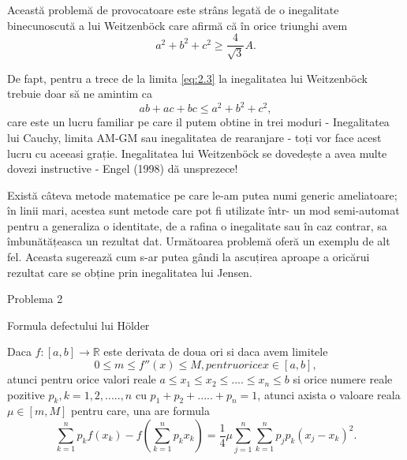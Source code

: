 \documentclass[a4paper,12pt,oneside]{report}
\begin{document}
Această problemă de provocatoare este strâns legată de o inegalitate binecunoscută a lui Weitzenböck care afirmă că în orice triunghi avem 
\begin{displaymath}
  a^{2} + b^{2} + c^{2} \geq \frac{4}{\sqrt{3}}A . \label{eq:2.4} \tag{2.4}
\end{displaymath}

De fapt, pentru a trece de la limita \ref{eq:2.3} la inegalitatea lui Weitzenböck trebuie doar să ne amintim ca 
\begin{displaymath}
  ab + ac + bc \leq a^{2} + b^{2} + c^{2}, 
\end{displaymath}
care este un lucru familiar pe care il putem obtine in trei moduri  - Inegalitatea lui Cauchy, limita AM-GM sau inegalitatea de rearanjare -  toți vor face acest lucru cu aceeasi grație.
	Inegalitatea lui Weitzenböck se dovedește a avea multe dovezi instructive - Engel (1998) dă unsprezece! 

Există câteva metode matematice pe care le-am putea numi generic ameliatoare; în linii mari, acestea sunt metode care pot fi utilizate într- un mod semi-automat pentru a generaliza o identitate, de a rafina o inegalitate sau în caz contrar, sa îmbunătățeasca un rezultat dat. 
Următoarea problemă oferă un exemplu de alt fel. Aceasta sugerează cum s-ar putea gândi la ascuțirea aproape a oricărui rezultat care se obține prin inegalitatea lui Jensen.

Problema 2

Formula defectului lui Hölder

Daca \(f : \left [ a,b  \right ] \to \mathbb{R}\) este derivata de doua ori si daca avem limitele 
\begin{displaymath}
  0 \leq m \leq  f''\left ( x \right ) \leq  M , pentru orice x\in \left [ a,b \right ], \label{eq:2.5} \tag{2.5}
\end{displaymath}
atunci pentru orice valori reale \(a\leq x_{1}\leq x_{2}\leq ....\leq x_{n} \leq b \) si orice numere reale pozitive \(p_{k}, k= 1,2,.....,n \) cu \(p_{1} + p_{2} + .....+ p_{n} = 1\), atunci axista o valoare reala \(\mu \in \left [ m, M \right ]\) pentru care, una are formula
\begin{displaymath}
  \sum_{k = 1}^{n}p_{k}f\left ( x_{k} \right ) - f\left ( \sum_{k = 1}^{n} p_{k}x_{k}\right ) = \frac{1}{4}\mu \sum_{j = 1}^{n}\sum_{k = 1}^{n}p_{j}p_{k}\left ( x_{j} - x_{k} \right )^{2}. \label{eq:2.6} \tag{2.6}
\end{displaymath}
\end{document}

